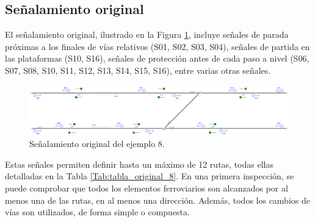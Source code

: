 \subsection{Señalamiento original}

    El señalamiento original, ilustrado en la Figura \ref{fig:EJ8_2}, incluye señales de parada próximas a los finales de vías relativos (S01, S02, S03, S04), señales de partida en las plataformas (S10, S16), señales de protección antes de cada paso a nivel (S06, S07, S08, S10, S11, S12, S13, S14, S15, S16), entre varias otras señales.
    
    \begin{figure}[H]
    	\centering
    	\includegraphics[width=1\textwidth]{resultados-obtenidos/ejemplo8/images/8_original.png}
    	\centering\caption{Señalamiento original del ejemplo 8.}
    	\label{fig:EJ8_2}
    \end{figure}
    
    Estas señales permiten definir hasta un máximo de 12 rutas, todas ellas detalladas en la Tabla \ref{Tab:tabla_original_8}. En una primera inspección, se puede comprobar que todos los elementos ferroviarios son alcanzados por al menos una de las rutas, en al menos una dirección. Además, todos los cambios de vías son utilizados, de forma simple o compuesta. 
    
